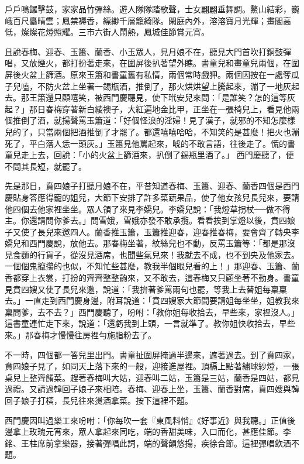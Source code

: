 戶戶鳴鑼擊鼓，家家品竹彈絲。遊人隊隊踏歌聲，士女翩翩垂舞調。鰲山結彩，巍峨百尺矗晴雲；鳳禁褥香，縹緲千層籠綺隊。閑庭內外，溶溶寶月光輝；畫閣高低，燦燦花燈照耀。三市六街人鬧熱，鳳城佳節賞元宵。

且說春梅、迎春、玉簫、蘭香、小玉眾人，見月娘不在，聽見大門首吹打銅鼓彈唱，又放煙火，都打扮著走來，在圍屏後扒著望外瞧。書童兒和畫童兒兩個，在圍屏後火盆上篩酒。原來玉簫和書童舊有私情，兩個常時戲狎。兩個因按在一處奪瓜子兒嗑，不防火盆上坐著一錫瓶酒，推倒了，那火烘烘望上騰起來，漰了一地灰起去。那王簫還只顧嘻笑，被西門慶聽見，使下玳安兒來問：「是誰笑？怎的這等灰起？」那日春梅穿著新白綾襖子，大紅遍地金比甲，正坐在一張椅兒上，看見他兩個推倒了酒，就揚聲罵玉簫道：「好個怪浪的淫婦！見了漢子，就邪的不知怎麼樣兒的了，只當兩個把酒推倒了才罷了。都還嘻嘻哈哈，不知笑的是甚麼！把火也漰死了，平白落人恁一頭灰。」玉簫見他罵起來，唬的不敢言語，往後走了。慌的書童兒走上去，回說：「小的火盆上篩酒來，扒倒了錫瓶里酒了。」 西門慶聽了，便不問其長短，就罷了。

先是那日，賁四娘子打聽月娘不在，平昔知道春梅、玉簫、迎春、蘭香四個是西門慶貼身答應得寵的姐兒，大節下安排了許多菜蔬果品，使了他女孩兒長兒來，要請他四個去他家裡坐坐。眾人領了來見李嬌兒。李嬌兒說：「我燈草拐杖──做不得主。你還請問你爹去。」問雪娥，雪娥亦發不敢承攬。看看挨到掌燈以後，賁四娘子又使了長兒來邀四人。蘭香推玉簫，玉簫推迎春，迎春推春梅，要會齊了轉央李嬌兒和西門慶說，放他去。那春梅坐著，紋絲兒也不動，反罵玉簫等：「都是那沒見食麵的行貨子，從沒見酒席，也聞些氣兒來！我就去不成，也不到央及他家去。一個個鬼攛攥的也似，不知忙些甚麼，教我半個眼兒看的上！」那迎春、玉簫、蘭香都穿上衣裳，打扮的齊齊整整齣來，又不敢去，這春梅又只顧坐著不動身。書童見賁四嫂又使了長兒來邀，說道：「我拚著爹罵兩句也罷，等我上去替姐每稟稟去。」一直走到西門慶身邊，附耳說道：「賁四嫂家大節間要請姐每坐坐，姐教我來稟問爹，去不去？」西門慶聽了，吩咐：「教你姐每收拾去，早些來，家裡沒人。」這書童連忙走下來，說道：「還虧我到上頭，一言就準了。教你姐快收拾去，早些來。」那春梅才慢慢往房裡勻施脂粉去了。

不一時，四個都一答兒里出門。書童扯圍屏掩過半邊來，遮著過去。到了賁四家，賁四娘子見了，如同天上落下來的一般，迎接進屋裡。頂槅上點著繡球紗燈，一張桌兒上整齊餚菜。趕著春梅叫大姑，迎春叫二姑，玉簫是三姑，蘭香是四姑，都見過禮。又請過韓回子娘子來相陪。春梅、迎春上坐，玉簫、蘭香對席，賁四嫂與韓回子娘子打橫，長兒往來燙酒拿菜。按下這裡不題。

西門慶因叫過樂工來吩咐：「你每吹一套『東風料悄』《好事近》與我聽。」正值後邊拿上玫瑰元宵來，眾人拿起來同吃，端的香甜美味，入口而化，甚應佳節。李銘、王柱席前拿樂器，接著彈唱此詞，端的聲韻悠揚，疾徐合節。這裡彈唱飲酒不題。

